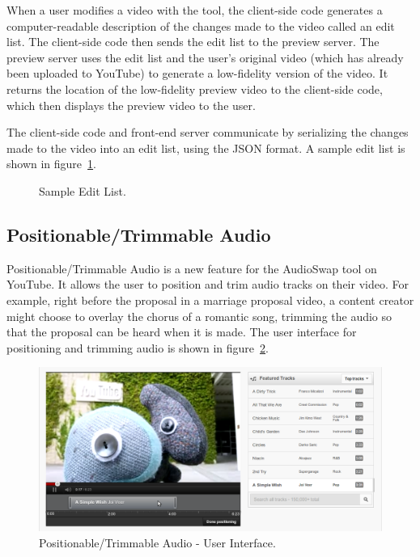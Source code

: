 \documentclass[se,resubmit]{uw-wkrpt}
\begin{document}
When a user modifies a video with the tool, the client-side code generates
a computer-readable description of the changes made to the video called an
edit list. The client-side code then sends the edit list to the preview
server. The preview server uses the edit list and the user's original
video (which has already been uploaded to YouTube) to generate a
low-fidelity version of the video. It returns the location of the
low-fidelity preview video to the client-side code, which then displays
the preview video to the user.

The client-side code and front-end server communicate by serializing the
changes made to the video into an edit list, using the JSON format. A
sample edit list is shown in figure~\ref{fig:editlist}.

\begin{figure}
  \centering
  
  \caption{Sample Edit List.}
  \label{fig:editlist}
\end{figure}

\subsection{Positionable/Trimmable Audio}\label{sec:ptaudio}
Positionable/Trimmable Audio is a new feature for the AudioSwap tool on
YouTube. It allows the user to position and trim audio tracks on their
video. For example, right before the proposal in a marriage proposal video,
a content creator might choose to overlay the chorus of a romantic song,
trimming the audio so that the proposal can be heard when it is made. The
user interface for positioning and trimming audio is shown in
figure~\ref{fig:overview}.

\begin{figure}
  \centering
  \includegraphics[width=5.515in]{overview}
  \caption{Positionable/Trimmable Audio - User Interface.}
  \label{fig:overview}
\end{figure}
\end{document}
